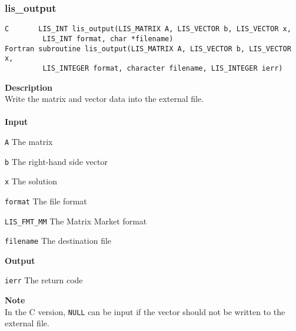 \documentclass[a4paper]{article}
\newcommand{\namelistlabel}[1]{\mbox{#1}\hfill}
\newenvironment{namelist}[1]{%
\begin{list}{}
  {\let\makelabel\namelistlabel
  \settowidth{\labelwidth}{#1}
  \setlength{\leftmargin}{1.1\labelwidth}}
  }{%
\end{list}}
\begin{document}
\subsubsection{lis\_output}
\begin{screen}
\verb|C       LIS_INT lis_output(LIS_MATRIX A, LIS_VECTOR b, LIS_VECTOR x,|\\
\verb|         LIS_INT format, char *filename)|\\
\verb|Fortran subroutine lis_output(LIS_MATRIX A, LIS_VECTOR b, LIS_VECTOR x,|\\
\verb|         LIS_INTEGER format, character filename, LIS_INTEGER ierr)|
\end{screen}
{\bf Description}\\
\indent
Write the matrix and vector data into the external file.
\\ \\
\noindent
{\bf Input}
\begin{namelist}{XXXXXXXXXXXXXXXXXXXX}
\item[\tt A] The matrix
\item[\tt b] The right-hand side vector 
\item[\tt x] The solution 
\item[\tt format] The file format
\begin{namelist}{XXXXXXXXXXXXXXXXXXXX}
\item[\tt LIS\_FMT\_MM] The Matrix Market format
\end{namelist}
\item[\tt filename] The destination file
\end{namelist}
{\bf Output}
\begin{namelist}{XXXXXXXXXXXXXXXXXXXX}
\item[\tt ierr] The return code
\end{namelist}
{\bf Note}\\
\indent
In the C version, {\tt NULL} can be input if the vector should not be written to the external file.
\end{document}
